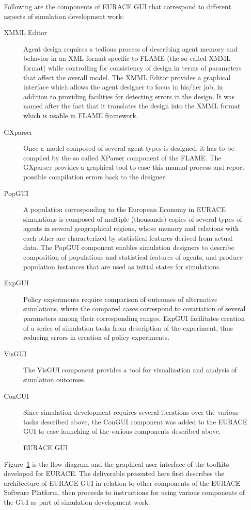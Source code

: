 \documentclass[urop]{socreport}
\begin{document}
Following are the components of EURACE GUI that correspond to different aspects of simulation development work:
\begin{description}
\item[XMML Editor] Agent design requires a tedious process of describing agent memory and behavior in an XML format specific to FLAME (the so called XMML format) while controlling for consistency of design in terms of parameters that affect the overall model. The XMML Editor provides a graphical interface which allows the agent designer to focus in his/her job, in addition to providing facilities for detecting errors in the design. It was named after the fact that it translates the design into the XMML format which is usable in FLAME framework.
\item[GXparser] Once a model composed of several agent types is designed, it has to be compiled by the so called XParser component of the FLAME. The GXparser provides a graphical tool to ease this manual process and report possible compilation errors back to the designer.
\item[PopGUI] A population corresponding to the European Economy in EURACE simulations is composed of multiple (thousands) copies of several types of agents in several geographical regions, whose memory and relations with each other are characterized by statistical features derived from actual data. The PopGUI component enables simulation designers to describe composition of populations and statistical features of agents, and produce population instances that are used as initial states for simulations.
\item[ExpGUI] Policy experiments require comparison of outcomes of alternative simulations, where the compared cases correspond to covariation of several parameters among their corresponding ranges. ExpGUI facilitates creation of a series of simulation tasks from description of the experiment, thus reducing errors in creation of policy experiments.
\item[VisGUI] The VisGUI component provides a tool for visualization and analysis of simulation outcomes.
\item[ConGUI] Since simulation development requires several iterations over the various tasks described above, the ConGUI component was added to the EURACE GUI to ease launching of the various components described above.
\end{description}

\begin{figure}[h]
  \centering
{}
  \caption{EURACE GUI}
  \label{figure:congui}
\end{figure}
Figure~\ref{figure:congui} is the flow diagram and the graphical user interface of the toolkits developed for EURACE. The deliverable presented here first describes the architecture of EURACE GUI in relation to other components of the EURACE Software Platform, then proceeds to instructions for using various components of the GUI as part of simulation development work.
\end{document}

